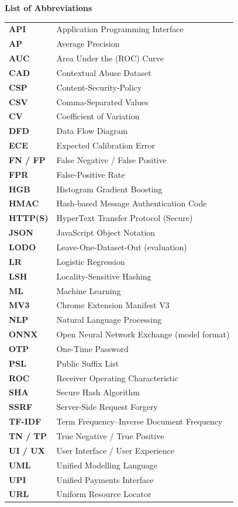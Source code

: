 \newpage
\thispagestyle{plain}
\begin{center}
\textbf {{\Large List of Abbreviations}} \\
\vspace{1pc}
\end{center}
\singlespacing
{\renewcommand{\arraystretch}{1.25}
\begin{tabular}{p{3cm} p{11cm}}
\textbf{API} & Application Programming Interface \\
\textbf{AP} & Average Precision \\
\textbf{AUC} & Area Under the (ROC) Curve \\
\textbf{CAD} & Contextual Abuse Dataset \\
\textbf{CSP} & Content-Security-Policy \\
\textbf{CSV} & Comma-Separated Values \\
\textbf{CV} & Coefficient of Variation \\
\textbf{DFD} & Data Flow Diagram \\
\textbf{ECE} & Expected Calibration Error \\
\textbf{FN / FP} & False Negative / False Positive \\
\textbf{FPR} & False-Positive Rate \\
\textbf{HGB} & Histogram Gradient Boosting \\
\textbf{HMAC} & Hash-based Message Authentication Code \\
\textbf{HTTP(S)} & HyperText Transfer Protocol (Secure) \\
\textbf{JSON} & JavaScript Object Notation \\
\textbf{LODO} & Leave-One-Dataset-Out (evaluation) \\
\textbf{LR} & Logistic Regression \\
\textbf{LSH} & Locality-Sensitive Hashing \\
\textbf{ML} & Machine Learning \\
\textbf{MV3} & Chrome Extension Manifest V3 \\
\textbf{NLP} & Natural Language Processing \\
\textbf{ONNX} & Open Neural Network Exchange (model format) \\
\textbf{OTP} & One-Time Password \\
\textbf{PSL} & Public Suffix List \\
\textbf{ROC} & Receiver Operating Characteristic \\
\textbf{SHA} & Secure Hash Algorithm \\
\textbf{SSRF} & Server-Side Request Forgery \\
\textbf{TF-IDF} & Term Frequency--Inverse Document Frequency \\
\textbf{TN / TP} & True Negative / True Positive \\
\textbf{UI / UX} & User Interface / User Experience \\
\textbf{UML} & Unified Modelling Language \\
\textbf{UPI} & Unified Payments Interface \\
\textbf{URL} & Uniform Resource Locator \\
\end{tabular}}
